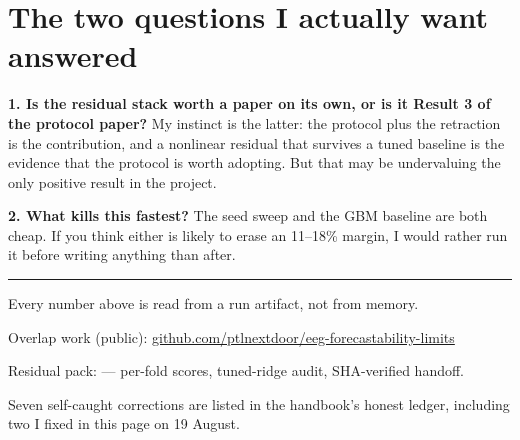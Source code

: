 \documentclass[11pt]{article}
\begin{document}
\section{The two questions I actually want answered}

\textbf{1. Is the residual stack worth a paper on its own, or is it Result 3 of
the protocol paper?} My instinct is the latter: the protocol plus the
retraction is the contribution, and a nonlinear residual that survives a tuned
baseline is the evidence that the protocol is worth adopting. But that may be
undervaluing the only positive result in the project.

\textbf{2. What kills this fastest?} The seed sweep and the GBM baseline are
both cheap. If you think either is likely to erase an 11--18\% margin, I would
rather run it before writing anything than after.

\vspace{6pt}
\hrule
\vspace{4pt}
{\color{graytext}\small
Every number above is read from a run artifact, not from memory.

\smallskip
Overlap work (public): \url{github.com/ptlnextdoor/eeg-forecastability-limits}

Residual pack: 
--- per-fold scores, tuned-ridge audit, SHA-verified handoff.

\smallskip
Seven self-caught corrections are listed in the handbook's honest ledger,
including two I fixed in this page on 19 August.}
\end{document}
